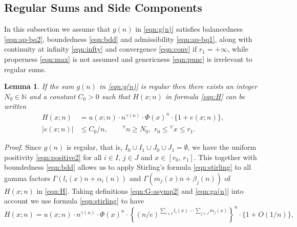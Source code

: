 \documentclass[a4paper,12pt]{article}
\theoremstyle{plain}
\newtheorem{lemma}[theorem]{Lemma}
\def\N{\mathbb{N}}
\def\vG{\varGamma}
\begin{document}
\subsection{Regular Sums and Side Components} \label{subsec:regular} 
\par
In this subsection we assume that $g(n)$ in \eqref{eqn:g(n)} satisfies 
balancedness \eqref{eqn:ap-bq2}, boundedness \eqref{eqn:bdd} and admissibility 
\eqref{eqn:ap-bq1}, along with continuity at infinity \eqref{eqn:infty} and 
convergence \eqref{eqn:conv} if $r_1 = + \infty$, while 
properness \eqref{eqn:max} is not assumed  and 
genericness \eqref{eqn:punc} is irrelevant to regular sums.   
\begin{lemma} \label{lem:H} 
If the sum $g(n)$ in \eqref{eqn:g(n)} is regular then there exists an integer 
$N_0 \in \N$ and a constant $C_0 > 0$ such that $H(x; n)$ in formula 
\eqref{eqn:H} can be written     
\begin{subequations} \label{eqn:H-asymp}
\begin{align}  
H(x; n) &= u(x; n)  \cdot n^{\gamma(n)} \cdot \Phi(x)^n \cdot \{1+ e(x; n) \}, 
\label{eqn:H-asymp1} \\[1mm]
|e( x; n)| &\le C_0/n,  \qquad 
{}^{\forall} n \ge N_0, \,\, r_0 \le {}^{\forall} x \le r_1.    
\label{eqn:H-asymp2}     
\end{align}
\end{subequations}
\end{lemma} 
{\it Proof}. 
Since $g(n)$ is regular, that is, $I_0 \cup I_1 \cup J_0 \cup J_1 = \emptyset$, we 
have the uniform positivity \eqref{eqn:positive2} for all $i \in I$, $j \in J$ and 
$x \in [r_0, \, r_1]$.   
This together with boundedness \eqref{eqn:bdd} allows us to apply Stirling's 
formula \eqref{eqn:stirling} to all gamma factors  
$\vG(l_i(x) n + \alpha_i(n))$ and $\vG(m_j(x) n + \beta_j(n))$ of $H(x; n)$ in  \eqref{eqn:H}. 
Taking definitions \eqref{eqn:G-asymp2} and \eqref{eqn:ga(n)} into account  
we use formula \eqref{eqn:stirling} to have 
\[
H(x; n) = u(x; n) \cdot n^{\gamma(n)} \cdot \Phi(x)^n \cdot
\left\{ (n/e)^{\sum_{i \in I} l_i(x) - \sum_{j \in J} m_j(x)} \right \}^n \cdot 
\{1 + O(1/n) \}, 
\]
\end{document}
